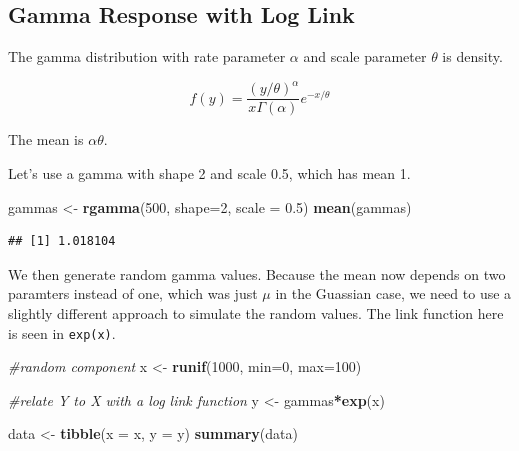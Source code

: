 \documentclass[openany]{book}
\newenvironment{Shaded}{\begin{snugshade}}{\end{snugshade}}
\newcommand{\CommentTok}[1]{\textcolor[rgb]{0.56,0.35,0.01}{\textit{#1}}}
\newcommand{\DataTypeTok}[1]{\textcolor[rgb]{0.13,0.29,0.53}{#1}}
\newcommand{\DecValTok}[1]{\textcolor[rgb]{0.00,0.00,0.81}{#1}}
\newcommand{\FloatTok}[1]{\textcolor[rgb]{0.00,0.00,0.81}{#1}}
\newcommand{\KeywordTok}[1]{\textcolor[rgb]{0.13,0.29,0.53}{\textbf{#1}}}
\newcommand{\NormalTok}[1]{#1}
\newcommand{\OperatorTok}[1]{\textcolor[rgb]{0.81,0.36,0.00}{\textbf{#1}}}
\newcommand{\StringTok}[1]{\textcolor[rgb]{0.31,0.60,0.02}{#1}}
\begin{document}
\hypertarget{gamma-response-with-log-link}{%
\subsection{Gamma Response with Log Link}\label{gamma-response-with-log-link}}

The gamma distribution with rate parameter \(\alpha\) and scale parameter \(\theta\) is density.

\[f(y) = \frac{(y/\theta)^\alpha}{x \Gamma(\alpha)}e^{-x/\theta}\]

The mean is \(\alpha\theta\).

Let's use a gamma with shape 2 and scale 0.5, which has mean 1.

\begin{Shaded}
\begin{Highlighting}[]
\NormalTok{gammas <-}\StringTok{ }\KeywordTok{rgamma}\NormalTok{(}\DecValTok{500}\NormalTok{, }\DataTypeTok{shape=}\DecValTok{2}\NormalTok{, }\DataTypeTok{scale =} \FloatTok{0.5}\NormalTok{)}
\KeywordTok{mean}\NormalTok{(gammas)}
\end{Highlighting}
\end{Shaded}

\begin{verbatim}
## [1] 1.018104
\end{verbatim}

We then generate random gamma values. Because the mean now depends on two paramters instead of one, which was just \(\mu\) in the Guassian case, we need to use a slightly different approach to simulate the random values. The link function here is seen in \texttt{exp(x)}.

\begin{Shaded}
\begin{Highlighting}[]
\CommentTok{#random component}
\NormalTok{x <-}\StringTok{ }\KeywordTok{runif}\NormalTok{(}\DecValTok{1000}\NormalTok{, }\DataTypeTok{min=}\DecValTok{0}\NormalTok{, }\DataTypeTok{max=}\DecValTok{100}\NormalTok{)}

\CommentTok{#relate Y to X with a log link function}
\NormalTok{y <-}\StringTok{ }\NormalTok{gammas}\OperatorTok{*}\KeywordTok{exp}\NormalTok{(x)}

\NormalTok{data <-}\StringTok{ }\KeywordTok{tibble}\NormalTok{(}\DataTypeTok{x =}\NormalTok{ x, }\DataTypeTok{y  =}\NormalTok{ y)}
\KeywordTok{summary}\NormalTok{(data)}
\end{Highlighting}
\end{Shaded}
\end{document}
